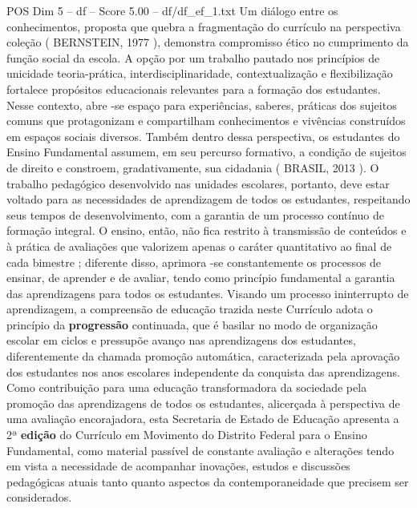 \begin{textsample}{POS Dim 5 – df – Score 5.00 – df/df\_ef\_1.txt}
Um diálogo entre os conhecimentos, proposta que quebra a fragmentação do currículo na perspectiva coleção ( BERNSTEIN, 1977 ), demonstra compromisso ético no cumprimento da função social da escola.
A opção por um trabalho pautado nos princípios de unicidade teoria-prática, interdisciplinaridade, contextualização e flexibilização fortalece propósitos educacionais relevantes para a formação dos estudantes.
Nesse contexto, abre -se espaço para experiências, saberes, práticas dos sujeitos comuns que protagonizam e compartilham conhecimentos e vivências construídos em espaços sociais diversos.
Também dentro dessa perspectiva, os estudantes do Ensino Fundamental assumem, em seu percurso formativo, a condição de sujeitos de direito e constroem, gradativamente, sua cidadania ( BRASIL, 2013 ).
O trabalho pedagógico desenvolvido nas unidades escolares, portanto, deve estar voltado para as necessidades de aprendizagem de todos os estudantes, respeitando seus tempos de desenvolvimento, com a garantia de um processo contínuo de formação integral.
O ensino, então, não fica restrito à transmissão de conteúdos e à prática de avaliações que valorizem apenas o caráter quantitativo ao final de cada bimestre ; diferente disso, aprimora -se constantemente os processos de ensinar, de aprender e de avaliar, tendo como princípio fundamental a garantia das aprendizagens para todos os estudantes.
Visando um processo ininterrupto de aprendizagem, a compreensão de educação trazida neste Currículo adota o princípio da \textbf{progressão} continuada, que é basilar no modo de organização escolar em ciclos e pressupõe avanço nas aprendizagens dos estudantes, diferentemente da chamada promoção automática, caracterizada pela aprovação dos estudantes nos anos escolares independente da conquista das aprendizagens.
Como contribuição para uma educação transformadora da sociedade pela promoção das aprendizagens de todos os estudantes, alicerçada à perspectiva de uma avaliação encorajadora, esta Secretaria de Estado de Educação apresenta a 2ª \textbf{edição} do Currículo em Movimento do Distrito Federal para o Ensino Fundamental, como material passível de constante avaliação e alterações tendo em vista a necessidade de acompanhar inovações, estudos e discussões pedagógicas atuais tanto quanto aspectos da contemporaneidade que precisem ser considerados.

\end{textsample}
